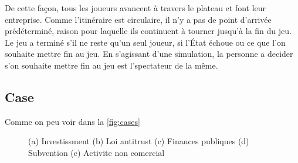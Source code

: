 \documentclass[12pt]{article}
\begin{document}
    De cette façon, tous les joueurs avancent à travers le plateau et font leur
entreprise. 
Comme l'itinéraire est circulaire, il n'y a pas de point d'arrivée prédéterminé,
raison pour laquelle ils continuent à tourner jusqu'à la fin du jeu. 
Le jeu a terminé s'il ne reste qu'un seul joueur, si l'État échoue ou ce que l'on souhaite mettre fin au jeu.
En s'agissant d'une simulation, la personne a decider s'on souhaite mettre fin au jeu est l'spectateur de la même.

    
    \subsection{Case}
  
    	Comme on peu voir dans la \autoref{fig:cases}
	  \begin{figure}
    \centering

   
    \caption{(a) Investissment (b) Loi antitrust (c) Finances publiques (d) Subvention (e) Activite non comercial}
    \label{fig:cases}
\end{figure}
\end{document}
